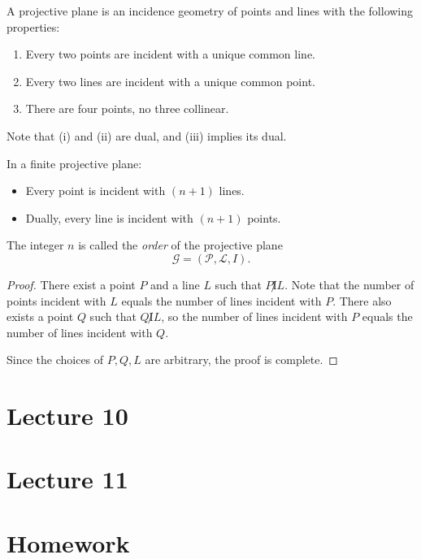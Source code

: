 \documentclass[11pt, a4paper]{ctexrep}
\begin{document}
    \begin{definition}
    A projective plane is an incidence geometry of points and lines with the following properties:
    \begin{enumerate}
        \item Every two points are incident with a unique common line.
        \item Every two lines are incident with a unique common point.
        \item There are four points, no three collinear.
    \end{enumerate}
    Note that \textup{(i)} and \textup{(ii)} are dual, and \textup{(iii)} implies its dual.
    \end{definition}
    
    \begin{proposition}
    In a finite projective plane:
    \begin{itemize}
        \item Every point is incident with $(n+1)$ lines.
        \item Dually, every line is incident with $(n+1)$ points.
    \end{itemize}
    The integer $n$ is called the \emph{order} of the projective plane
    \[
    \mathcal{G}=(\mathcal{P},\mathcal{L},I).
    \]
    \end{proposition}
    
    \begin{proof}
    There exist a point $P$ and a line $L$ such that $P \not I L$. Note that the number of points incident with $L$ equals the number of lines incident with $P$. There also exists a point $Q$ such that $Q \not I L$, so the number of lines incident with $P$ equals the number of lines incident with $Q$.
    
    Since the choices of $P,Q,L$ are arbitrary, the proof is complete.
    \end{proof}

\chapter{Lecture 10}

\chapter{Lecture 11}

\chapter{Homework}
\end{document}
